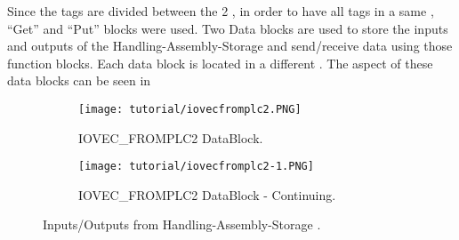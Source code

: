 \begin{observation}
  Since the tags are divided between the 2 \PLCs{}, in order to have all tags in
  a same \PLC, ``Get'' and ``Put'' blocks were used. Two Data blocks
  are used to store the inputs and outputs of the Handling-Assembly-Storage \PLC{} and send\slash receive data using those function blocks.
 Each data block is located in a different \PLC.
 The aspect of these data blocks can be seen in 
\end{observation}
\begin{figure}[H] \centering
\begin{subfigure}[h]{\textwidth} \centering
 \texttt{[image: tutorial/iovecfromplc2.PNG]}
  \caption{IOVEC\_FROMPLC2 DataBlock.}
  \label{fig:iovecFromPlc}
\end{subfigure}
\begin{subfigure}[h]{\textwidth} \centering
 \texttt{[image: tutorial/iovecfromplc2-1.PNG]}
  \caption{IOVEC\_FROMPLC2 DataBlock - Continuing.}
  \label{fig:iovecFromPlctwo}
\end{subfigure}
\caption{Inputs\slash Outputs from Handling-Assembly-Storage \PLC.}
\end{figure}

